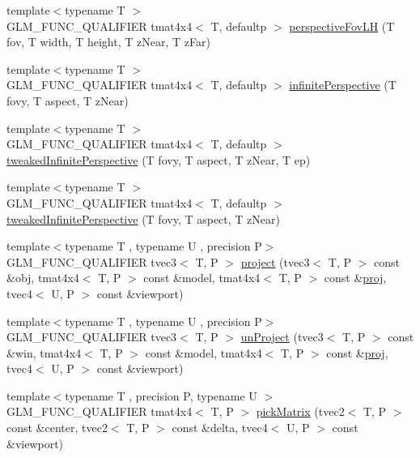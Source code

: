 \begin{DoxyCompactItemize}
\item 
{\footnotesize template$<$typename T $>$ }\\G\+L\+M\+\_\+\+F\+U\+N\+C\+\_\+\+Q\+U\+A\+L\+I\+F\+I\+E\+R tmat4x4$<$ T, defaultp $>$ \hyperlink{group__gtc__matrix__transform_gae705a2f19c3ef5ef880bd6c92759cf2d}{perspective\+Fov\+L\+H} (T fov, T width, T height, T z\+Near, T z\+Far)
\item 
{\footnotesize template$<$typename T $>$ }\\G\+L\+M\+\_\+\+F\+U\+N\+C\+\_\+\+Q\+U\+A\+L\+I\+F\+I\+E\+R tmat4x4$<$ T, defaultp $>$ \hyperlink{group__gtc__matrix__transform_ga79f704ad91a5f0d68abd88c66c8186e5}{infinite\+Perspective} (T fovy, T aspect, T z\+Near)
\item 
{\footnotesize template$<$typename T $>$ }\\G\+L\+M\+\_\+\+F\+U\+N\+C\+\_\+\+Q\+U\+A\+L\+I\+F\+I\+E\+R tmat4x4$<$ T, defaultp $>$ \hyperlink{group__gtc__matrix__transform_gaa50fce7f50b5d5da881ed30f5532a921}{tweaked\+Infinite\+Perspective} (T fovy, T aspect, T z\+Near, T ep)
\item 
{\footnotesize template$<$typename T $>$ }\\G\+L\+M\+\_\+\+F\+U\+N\+C\+\_\+\+Q\+U\+A\+L\+I\+F\+I\+E\+R tmat4x4$<$ T, defaultp $>$ \hyperlink{group__gtc__matrix__transform_gaed64bd81f5ecdab52fecbdf7f6b58194}{tweaked\+Infinite\+Perspective} (T fovy, T aspect, T z\+Near)
\item 
{\footnotesize template$<$typename T , typename U , precision P$>$ }\\G\+L\+M\+\_\+\+F\+U\+N\+C\+\_\+\+Q\+U\+A\+L\+I\+F\+I\+E\+R tvec3$<$ T, P $>$ \hyperlink{group__gtc__matrix__transform_gad743556abd138264d4f06f4ca27f1d7e}{project} (tvec3$<$ T, P $>$ const \&obj, tmat4x4$<$ T, P $>$ const \&model, tmat4x4$<$ T, P $>$ const \&\hyperlink{group__gtx__projection_gadf29123bcf748fc9d6fb0998192184cf}{proj}, tvec4$<$ U, P $>$ const \&viewport)
\item 
{\footnotesize template$<$typename T , typename U , precision P$>$ }\\G\+L\+M\+\_\+\+F\+U\+N\+C\+\_\+\+Q\+U\+A\+L\+I\+F\+I\+E\+R tvec3$<$ T, P $>$ \hyperlink{group__gtc__matrix__transform_ga82a558de3ce42cbeed0f6ec292a4e1b3}{un\+Project} (tvec3$<$ T, P $>$ const \&win, tmat4x4$<$ T, P $>$ const \&model, tmat4x4$<$ T, P $>$ const \&\hyperlink{group__gtx__projection_gadf29123bcf748fc9d6fb0998192184cf}{proj}, tvec4$<$ U, P $>$ const \&viewport)
\item 
{\footnotesize template$<$typename T , precision P, typename U $>$ }\\G\+L\+M\+\_\+\+F\+U\+N\+C\+\_\+\+Q\+U\+A\+L\+I\+F\+I\+E\+R tmat4x4$<$ T, P $>$ \hyperlink{group__gtc__matrix__transform_ga9026c77505b99990f68826f27c267dc5}{pick\+Matrix} (tvec2$<$ T, P $>$ const \&center, tvec2$<$ T, P $>$ const \&delta, tvec4$<$ U, P $>$ const \&viewport)

\end{DoxyCompactItemize}
